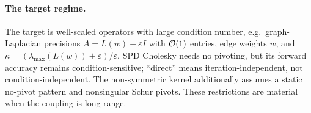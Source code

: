 \paragraph{The target regime.}
The target is well-scaled operators with large condition number, e.g.\
graph-Laplacian precisions $A = L(w) + \varepsilon I$ with $\mathcal{O}(1)$ entries,
edge weights $w$, and
$\kappa=(\lambda_{\max}(L(w))+\varepsilon)/\varepsilon$. SPD Cholesky needs no
pivoting, but its forward accuracy remains condition-sensitive; ``direct''
means iteration-independent, not condition-independent. The non-symmetric
kernel additionally assumes a static no-pivot pattern and nonsingular Schur
pivots. These restrictions are material when the coupling is long-range.
